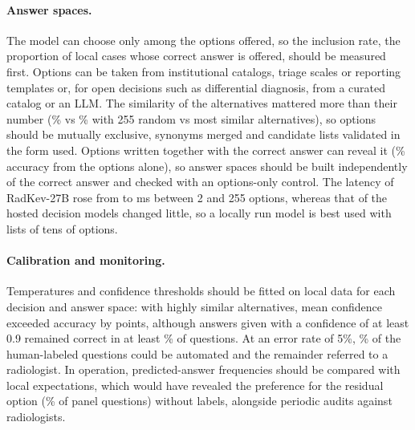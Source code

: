 \paragraph{Answer spaces.} The model can choose only among the options offered, so the inclusion rate, the proportion of local cases whose correct answer is offered, should be measured first. Options can be taken from institutional catalogs, triage scales or reporting templates or, for open decisions such as differential diagnosis, from a curated catalog or an LLM. The similarity of the alternatives mattered more than their number (\% vs \% with 255 random vs most similar alternatives), so options should be mutually exclusive, synonyms merged and candidate lists validated in the form used. Options written together with the correct answer can reveal it (\% accuracy from the options alone), so answer spaces should be built independently of the correct answer and checked with an options-only control. The latency of RadKev-27B rose from  to  ms between 2 and 255 options, whereas that of the hosted decision models changed little, so a locally run model is best used with lists of tens of options. %

\paragraph{Calibration and monitoring.} Temperatures and confidence thresholds should be fitted on local data for each decision and answer space: with highly similar alternatives, mean confidence exceeded accuracy by  points, although answers given with a confidence of at least 0.9 remained correct in at least \% of questions. At an error rate of 5\%, \% of the human-labeled questions could be automated and the remainder referred to a radiologist. In operation, predicted-answer frequencies should be compared with local expectations, which would have revealed the preference for the residual option (\% of panel questions) without labels, alongside periodic audits against radiologists. %

